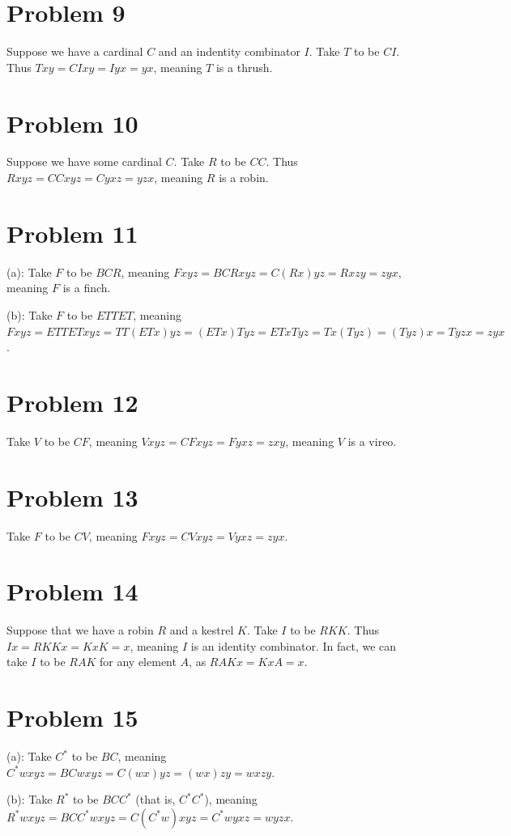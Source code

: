 \documentclass{article}
\theoremstyle{definition}
\begin{document}
\section*{Problem 9}
Suppose we have a cardinal $C$ and an indentity combinator $I$. Take $T$ to be $CI$. Thus $Txy=CIxy=Iyx=yx$, meaning $T$ is a thrush.

\section*{Problem 10}
Suppose we have some cardinal $C$. Take $R$ to be $CC$. Thus $Rxyz=CCxyz=Cyxz=yzx$, meaning $R$ is a robin.

\section*{Problem 11}
(a): Take $F$ to be $BCR$, meaning $Fxyz=BCRxyz=C(Rx)yz=Rxzy=zyx$, meaning $F$ is a finch.


(b): Take $F$ to be $ETTET$, meaning $Fxyz=ETTETxyz=TT(ETx)yz=(ETx)Tyz=ETxTyz=Tx(Tyz)=(Tyz)x=Tyzx=zyx$. 

\section*{Problem 12}
Take $V$ to be $CF$, meaning $Vxyz=CFxyz=Fyxz=zxy$, meaning $V$ is a vireo. 

\section*{Problem 13}
Take $F$ to be $CV$, meaning $Fxyz=CVxyz=Vyxz=zyx$.

\section*{Problem 14}
Suppose that we have a robin $R$ and a kestrel $K$. Take $I$ to be $RKK$. Thus $Ix=RKKx=KxK=x$, meaning $I$ is an identity combinator. In fact, we can take 
$I$ to be $RAK$ for any element $A$, as $RAKx=KxA=x$.

\section*{Problem 15}
(a): Take $C^*$ to be $BC$, meaning $C^*wxyz=BCwxyz=C(wx)yz=(wx)zy=wxzy$.


(b): Take $R^*$ to be $BCC^*$ (that is, $C^*C^*$), meaning $R^*wxyz=BCC^*wxyz=C(C^*w)xyz=C^*wyxz=wyzx$.
\end{document}
